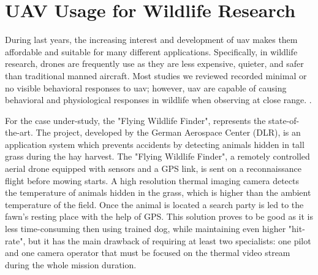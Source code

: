 \section{UAV Usage for Wildlife Research} %
\label{sec:state_of_the_art}
 During last years, the increasing interest and development of \acrfull{uav} makes them affordable and suitable for many different applications. Specifically, in wildlife research, drones are frequently use as they are less expensive, quieter, and safer than traditional manned aircraft. Most studies we reviewed recorded minimal or no visible behavioral responses to \acrshort{uav}; however, \acrshort{uav} are capable of causing behavioral and physiological responses in wildlife when observing at close range. \cite{doi:10.1002/fee.1281}.\par
 For the case under-study, the "Flying Wildlife Finder", represents the state-of-the-art.
 The project, developed by the German Aerospace Center (DLR), is an application system which prevents accidents by detecting animals hidden in tall grass during the hay harvest. 
 The "Flying Wildlife Finder", a remotely controlled aerial drone equipped with sensors and a GPS link, is sent on a reconnaissance flight before mowing starts. A high resolution thermal imaging camera detects the temperature of animals hidden in the grass, which is higher than the ambient temperature of the field. Once the animal is located a search party is led to the fawn’s resting place with the help of GPS.
 This solution proves to be good as it is less time-consuming then using trained dog, while maintaining even higher "hit-rate", but it has the main drawback of requiring at least two specialists: one pilot and one camera operator that must be focused on the thermal video stream during the whole mission duration.

 
 
